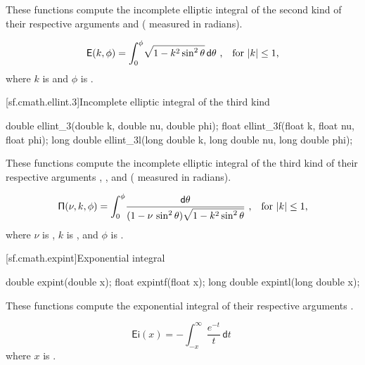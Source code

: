 \begin{itemdescr}
\pnum
\effects
These functions compute
the incomplete elliptic integral of the second kind
of their respective arguments
 and  ( measured in radians).

\pnum
\returns
\[ \mathsf{E}(k, \phi) = \int_0^\phi \! \sqrt{1 - k^2 \sin^2 \theta} \, \mathsf{d}\theta
   \text{ ,\quad for $|k| \le 1$,} \]
where
$k$ is  and
$\phi$ is .
\end{itemdescr}

[sf.cmath.ellint.3]{Incomplete elliptic integral of the third kind}%
%
%
%
%
%
\begin{itemdecl}
double       ellint_3(double k, double nu, double phi);
float        ellint_3f(float k, float nu, float phi);
long double  ellint_3l(long double k, long double nu, long double phi);
\end{itemdecl}

\begin{itemdescr}

\pnum
\effects
These functions compute
the incomplete elliptic integral of the third kind
of their respective arguments
, , and  ( measured in radians).

\pnum
\returns
\[ \mathsf{\Pi}(\nu, k, \phi) = \int_0^\phi \!
   \frac{ \mathsf{d}\theta }{ (1 - \nu \, \sin^2 \theta) \sqrt{1 - k^2 \sin^2 \theta} } \text{ ,\quad for $|k| \le 1$,} \]
where
$\nu$ is ,
$k$ is , and
$\phi$ is .
\end{itemdescr}

[sf.cmath.expint]{Exponential integral}%
%
%
%
%
%
\begin{itemdecl}
double       expint(double x);
float        expintf(float x);
long double  expintl(long double x);
\end{itemdecl}

\begin{itemdescr}

\pnum
\effects
These functions compute the exponential integral
of their respective arguments
.

\pnum
\returns
\[%
  \mathsf{Ei}(x) =
  - \int_{-x}^\infty \frac{e^{-t}}
                          {t     } \, \mathsf{d}t
\;
\]
where
$x$ is .
\end{itemdescr}

